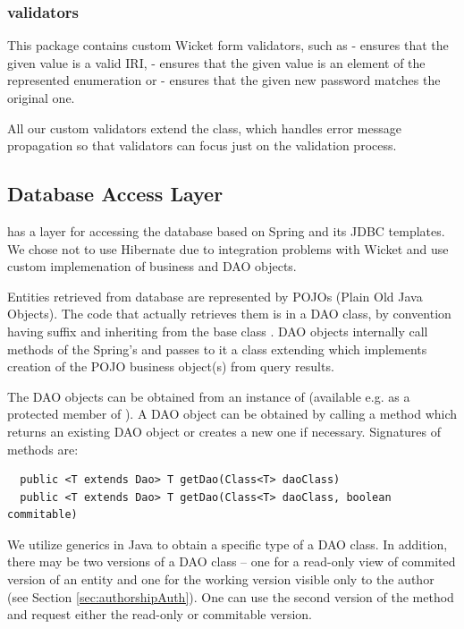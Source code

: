 \subsubsection{validators}

This package contains custom Wicket form validators, such as  - ensures that the given value is a valid IRI,  - ensures that the given value is an element of the represented enumeration or  - ensures that the given new password matches the original one.

All our custom validators extend the  class, which handles error message propagation so that validators can focus just on the validation process.

\subsection{Database Access Layer}
\label{sec:frontendDao}
\FE has a layer for accessing the database based on Spring and its JDBC templates. We chose not to use Hibernate due to integration problems with Wicket and use custom implemenation of business and DAO objects.

Entities retrieved from database are represented by POJOs (Plain Old Java Objects). The code that actually retrieves them is in a DAO class, by convention having suffix  and inheriting from the base class . DAO objects internally call methods of the Spring's  and passes to it a class extending  which implements creation of the POJO business object(s) from query results.

The DAO objects can be obtained from an instance of  (available e.g. as a protected member of ). A DAO object can be obtained by calling a  method which returns an existing DAO object or creates a new one if necessary. Signatures of  methods are:

\begin{verbatim}
  public <T extends Dao> T getDao(Class<T> daoClass)
  public <T extends Dao> T getDao(Class<T> daoClass, boolean commitable)
\end{verbatim}

We utilize generics in Java to obtain a specific type of a DAO class. In addition, there may be two versions of a DAO class -- one for a read-only view of commited version of an entity and one for the working version visible only to the author (see Section \ref{sec:authorshipAuth}). One can use the second version of the  method and request either the read-only or commitable version.

